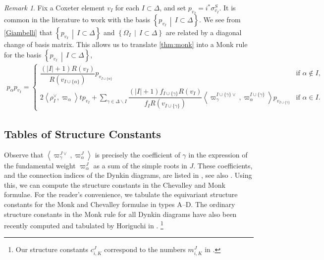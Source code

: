 \documentclass[10pt]{article}
\numberwithin{thm}{section}
\theoremstyle{definition}
\theoremstyle{remark}
\newtheorem{rem}[thm]{Remark}
\newcommand{\Pet}{\ensuremath{\mathbf{P}}}
\newcommand{\set}[2]{\left\{#1\,\middle\vert\,#2\right\}}
\begin{document}
\begin{rem}
\label{rem:monk}
Fix a Coxeter element $v_I$ for each $I\subset\Delta$,
and set $p_{v_I}=i^*\sigma_{v_I}^S$.
It is common in the literature to work with the basis $\set{p_{v_I}}{I\subset\Delta}$.
We see from \cref{Giambelli} that $\set{p_{v_I}}{I\subset\Delta}$ and $\set{\Omega_I}{I\subset\Delta}$
are related by a diagonal change of basis matrix.
This allows us to translate \cref{thm:monk} into a Monk rule for the basis $\set{p_{v_I}}{I\subset\Delta}$,
\begin{align*}
p_\alpha p_{v_I}=
\begin{cases}
\dfrac{(|I|+1)R(v_I)}{R(v_{I\cup\{\alpha\}})}p_{v_{I\cup\{\alpha\}}}
&\text{if }\alpha\not\in I,\\
2 
\left\langle\rho^\vee_I,\varpi_\alpha\right\rangle t p_{v_I}+
\sum\limits_{\gamma\in\Delta\backslash I}
\dfrac{(|I|+1)f_{I\cup\{\gamma\}} R(v_I)}{f_I R(v_{I\cup\{\gamma\}})}
\left\langle\varpi_\gamma^{I\cup\{\gamma\}\vee},\varpi^{I\cup\{\gamma\}}_\alpha\right\rangle p_{v_{I\cup\{\gamma\}}}
&\text{if }\alpha\in I.
\end{cases}
\end{align*}
\end{rem}



\subsection{Tables of Structure Constants}
\label{sec:examples}
Observe that $\left\langle\varpi_\gamma^{J\vee},\varpi_\alpha^J\right\rangle$ is precisely the coefficient of $\gamma$ in the expression of the fundamental weight $\varpi_\alpha^J$ as a sum of the simple roots in $J$.
These coefficients, and the connection indices of the Dynkin diagrams, are listed in \cite[Tables 2, 3]{onishchik.vinberg},
see also \cite[Ch.6, \S4]{bourbaki:Lie46}.
Using this, we can compute the structure constants in the Chevalley and Monk formulae.
For the reader's convenience, we tabulate the equivariant structure constants for the Monk and Chevalley formulae in types A--D.
The ordinary structure constants in the Monk rule for all Dynkin diagrams have also been recently computed and tabulated by Horiguchi in \cite[Table 2]{horiguchi2021mixed}.
\footnote{Our structure constants $c_{i,K}^J$ correspond to the numbers $m_{i,K}^J$ in \cite{horiguchi2021mixed}.}
\end{document}

